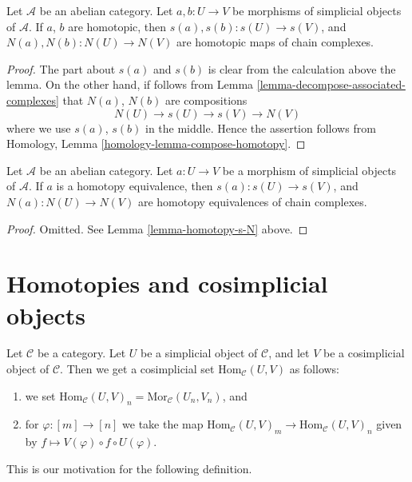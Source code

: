 \begin{lemma}
\label{lemma-homotopy-s-N}
Let $\mathcal{A}$ be an abelian category.
Let $a, b : U \to V$ be morphisms of simplicial
objects of $\mathcal{A}$. If $a$, $b$ are homotopic,
then $s(a), s(b) : s(U) \to s(V)$, and
$N(a), N(b) : N(U) \to N(V)$ are homotopic maps
of chain complexes.
\end{lemma}

\begin{proof}
The part about $s(a)$ and $s(b)$ is clear from the calculation
above the lemma. On the other hand, if follows from
Lemma \ref{lemma-decompose-associated-complexes} that
$N(a)$, $N(b)$ are compositions
$$
N(U) \to s(U) \to s(V) \to N(V)
$$
where we use $s(a)$, $s(b)$ in the middle. Hence the assertion
follows from
Homology, Lemma \ref{homology-lemma-compose-homotopy}.
\end{proof}

\begin{lemma}
\label{lemma-homotopy-equivalence-s-N}
Let $\mathcal{A}$ be an abelian category.
Let $a : U \to V$ be a morphism of simplicial
objects of $\mathcal{A}$. If $a$ is a homotopy equivalence,
then $s(a) : s(U) \to s(V)$, and
$N(a) : N(U) \to N(V)$ are homotopy equivalences of chain complexes.
\end{lemma}

\begin{proof}
Omitted. See Lemma \ref{lemma-homotopy-s-N} above.
\end{proof}




\section{Homotopies and cosimplicial objects}
\label{section-homotopy-cosimplicial}

\noindent
Let $\mathcal{C}$ be a category.
Let $U$ be a simplicial object of $\mathcal{C}$,
and let $V$ be a cosimplicial object of $\mathcal{C}$.
Then we get a cosimplicial set $\text{Hom}_\mathcal{C}(U, V)$
as follows:
\begin{enumerate}
\item we set
$\text{Hom}_\mathcal{C}(U, V)_n = \text{Mor}_\mathcal{C}(U_n, V_n)$, and
\item for $\varphi : [m] \to [n]$ we take the map
$\text{Hom}_\mathcal{C}(U, V)_m \to \text{Hom}_\mathcal{C}(U, V)_n$
given by $f \mapsto V(\varphi) \circ f \circ U(\varphi)$.
\end{enumerate}
This is our motivation for the following definition.

